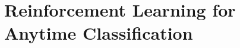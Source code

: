 
% 
\begin{frontmatter}
    \tableofcontents
\end{frontmatter}
\pagestyle{headings}

% 

% 

% 
% 
% 

\chapter{Reinforcement Learning for Anytime Classification}




% 

% 


\printbibliography

